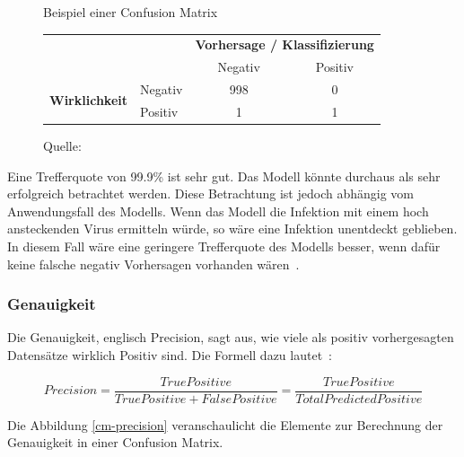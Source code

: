 \begin{figure}[h!]
    \centering
    \captionsetup{width=.9\linewidth}
    \caption{Beispiel einer Confusion Matrix}
    \label{cm-sample}
    \def\arraystretch{1.5}
    \begin{tabular}{llcc}
        \multicolumn{2}{l}{}                                                                       & \multicolumn{2}{c}{\textbf{Vorhersage / Klassifizierung}}   \\ \cline{3-4} 
        \multicolumn{1}{c}{\textbf{}}                               & \multicolumn{1}{l|}{}        & \multicolumn{1}{c|}{Negativ} & \multicolumn{1}{c|}{Positiv} \\ \cline{2-4} 
        \multicolumn{1}{l|}{\multirow{2}{*}{\textbf{Wirklichkeit}}} & \multicolumn{1}{l|}{Negativ} & \multicolumn{1}{c|}{998}    & \multicolumn{1}{c|}{0}       \\ \cline{2-4} 
        \multicolumn{1}{l|}{}                                       & \multicolumn{1}{l|}{Positiv} & \multicolumn{1}{c|}{1}       & \multicolumn{1}{c|}{1}       \\ \cline{2-4} 
    \end{tabular}
    \vspace*{0.3cm}
    \caption*{Quelle: \textcite{TDSAccuracy}}
\end{figure}

Eine Trefferquote von 99.9\% ist sehr gut. Das Modell könnte durchaus als sehr erfolgreich betrachtet werden. Diese Betrachtung ist jedoch abhängig vom Anwendungsfall des Modells. Wenn das Modell die Infektion mit einem hoch ansteckenden Virus ermitteln würde, so wäre eine Infektion unentdeckt geblieben. In diesem Fall wäre eine geringere Trefferquote des Modells besser, wenn dafür keine falsche negativ Vorhersagen vorhanden wären~\autocite{TDSAccuracy}.

\subsubsection{Genauigkeit}

Die Genauigkeit, englisch Precision, sagt aus, wie viele als positiv vorhergesagten Datensätze wirklich Positiv sind. Die Formell dazu lautet~\autocite{TDSAccuracy}: 

\nopagebreak
$$Precision = \frac{True Positive}{True Positive + False Positive} = \frac{True Positive}{Total Predicted Positive}$$
\vspace*{0.2cm}

Die Abbildung \ref{cm-precision} veranschaulicht die Elemente zur Berechnung der Genauigkeit in einer Confusion Matrix.

